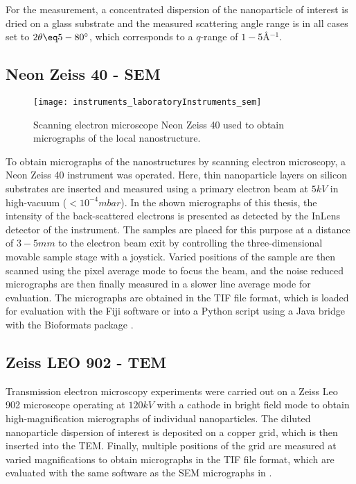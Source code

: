 \documentclass[\main/dresen_thesis.tex]{subfiles}
\begin{document}
    For the measurement, a concentrated dispersion of the nanoparticle of interest is dried on a glass substrate and the measured scattering angle range is in all cases set to $2 \theta \eq 5 - 80^\circ$, which corresponds to a $q$-range of $1 - 5 \unit{\angstrom^{-1}}$.


  \subsection{Neon Zeiss 40 - SEM}
    \label{ch:instruments:laboratoryInstruments:sem}
    \begin{figure}[ht]
      \centering
      \texttt{[image: instruments\_laboratoryInstruments\_sem]}
      \caption{\label{fig:appendix:instruments:sem}Scanning electron microscope Neon Zeiss 40 used to obtain micrographs of the local nanostructure.}
    \end{figure}
    To obtain micrographs of the nanostructures by scanning electron microscopy, a Neon Zeiss 40 instrument was operated.
    Here, thin nanoparticle layers on silicon substrates are inserted and measured using a primary electron beam at $5 \unit{kV}$ in high-vacuum ($< 10^{-4} \unit{mbar}$).
    In the shown micrographs of this thesis, the intensity of the back-scattered electrons is presented as detected by the InLens detector of the instrument.
    The samples are placed for this purpose at a distance of $3 - 5 \unit{mm}$ to the electron beam exit by controlling the three-dimensional movable sample stage with a joystick.
    Varied positions of the sample are then scanned using the pixel average mode to focus the beam, and the noise reduced micrographs are then finally measured in a slower line average mode for evaluation.
    The micrographs are obtained in the TIF file format, which is loaded for evaluation with the Fiji software \cite{Schindelin_2012_Fijia} or into a Python script using a Java bridge with the Bioformats package \cite{Linkert_2010_Metad}.

  \subsection{Zeiss LEO 902 - TEM}
    \label{ch:instruments:laboratoryInstruments:tem}
    Transmission electron microscopy experiments were carried out on a Zeiss Leo 902 microscope operating at $120 \unit{kV}$ with a  cathode in bright field mode to obtain high-magnification micrographs of individual nanoparticles.
    The diluted nanoparticle dispersion of interest is deposited on a copper grid, which is then inserted into the TEM.
    Finally, multiple positions of the grid are measured at varied magnifications to obtain micrographs in the TIF file format, which are evaluated with the same software as the SEM micrographs in .
\end{document}
